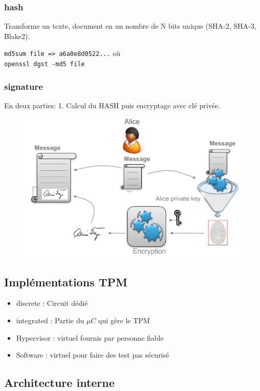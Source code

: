\documentclass[resume]{subfiles}
\begin{document}
\subsubsection{hash}

Transforme un texte, document en un nombre de N bits unique (SHA-2, SHA-3, Blake2).

\verb!md5sum file => a6a0e8d0522...! 
où\\
\verb!openssl dgst -md5 file!  

\subsubsection{signature}
\label{sec_sign}
En deux parties: 1. Calcul du HASH puis encryptage avec clé privée. 
\begin{figure}[H]
    \centering
    \includegraphics[width=0.7\columnwidth]{Figures/TPM/signature.png}
\end{figure}

\subsection{Implémentations TPM}
\begin{itemize}
\item discrete : Circuit dédié 
\item integrated : Partie du $\mu C$ qui gère le TPM
\item Hypervisor : virtuel fournis par personne fiable
\item Software : virtuel pour faire des test pas sécurisé
\end{itemize}

\subsection{Architecture interne}
\end{document}
